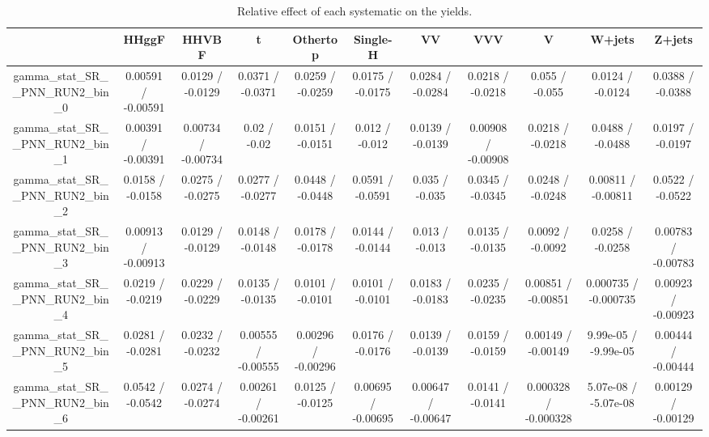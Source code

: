 \documentclass[10pt]{article}
\begin{document}
\begin{table}[htbp]
\begin{center}
\begin{tabular}{|c|c|c|c|c|c|c|c|c|c|c|}
\hline 
      & HHggF      & HHVBF      & t      & Othertop      & Single-H      & VV      & VVV      & V      & W+jets      & Z+jets \\ 
\hline 
  gamma_stat_SR__PNN_RUN2_bin_0 & 0.00591 / -0.00591 & 0.0129 / -0.0129 & 0.0371 / -0.0371 & 0.0259 / -0.0259 & 0.0175 / -0.0175 & 0.0284 / -0.0284 & 0.0218 / -0.0218 & 0.055 / -0.055 & 0.0124 / -0.0124 & 0.0388 / -0.0388 \\ 
  gamma_stat_SR__PNN_RUN2_bin_1 & 0.00391 / -0.00391 & 0.00734 / -0.00734 & 0.02 / -0.02 & 0.0151 / -0.0151 & 0.012 / -0.012 & 0.0139 / -0.0139 & 0.00908 / -0.00908 & 0.0218 / -0.0218 & 0.0488 / -0.0488 & 0.0197 / -0.0197 \\ 
  gamma_stat_SR__PNN_RUN2_bin_2 & 0.0158 / -0.0158 & 0.0275 / -0.0275 & 0.0277 / -0.0277 & 0.0448 / -0.0448 & 0.0591 / -0.0591 & 0.035 / -0.035 & 0.0345 / -0.0345 & 0.0248 / -0.0248 & 0.00811 / -0.00811 & 0.0522 / -0.0522 \\ 
  gamma_stat_SR__PNN_RUN2_bin_3 & 0.00913 / -0.00913 & 0.0129 / -0.0129 & 0.0148 / -0.0148 & 0.0178 / -0.0178 & 0.0144 / -0.0144 & 0.013 / -0.013 & 0.0135 / -0.0135 & 0.0092 / -0.0092 & 0.0258 / -0.0258 & 0.00783 / -0.00783 \\ 
  gamma_stat_SR__PNN_RUN2_bin_4 & 0.0219 / -0.0219 & 0.0229 / -0.0229 & 0.0135 / -0.0135 & 0.0101 / -0.0101 & 0.0101 / -0.0101 & 0.0183 / -0.0183 & 0.0235 / -0.0235 & 0.00851 / -0.00851 & 0.000735 / -0.000735 & 0.00923 / -0.00923 \\ 
  gamma_stat_SR__PNN_RUN2_bin_5 & 0.0281 / -0.0281 & 0.0232 / -0.0232 & 0.00555 / -0.00555 & 0.00296 / -0.00296 & 0.0176 / -0.0176 & 0.0139 / -0.0139 & 0.0159 / -0.0159 & 0.00149 / -0.00149 & 9.99e-05 / -9.99e-05 & 0.00444 / -0.00444 \\ 
  gamma_stat_SR__PNN_RUN2_bin_6 & 0.0542 / -0.0542 & 0.0274 / -0.0274 & 0.00261 / -0.00261 & 0.0125 / -0.0125 & 0.00695 / -0.00695 & 0.00647 / -0.00647 & 0.0141 / -0.0141 & 0.000328 / -0.000328 & 5.07e-08 / -5.07e-08 & 0.00129 / -0.00129 \\ 
\hline 
\end{tabular} 
\caption{Relative effect of each systematic on the yields.} 
\end{center} 
\end{table} 
\end{document}
